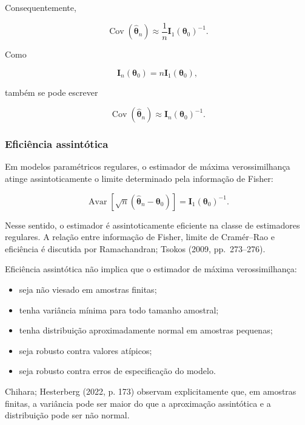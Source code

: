 \documentclass[
  letterpaper,
  DIV=11,
  numbers=noendperiod]{scrreprt}
\providecommand{\tightlist}{%
  \setlength{\itemsep}{0pt}\setlength{\parskip}{0pt}}\usepackage{longtable,booktabs,array}
\begin{document}
Consequentemente,

\[\operatorname{Cov}
\left(
\widehat{\boldsymbol\theta}_n
\right)
\approx
\frac{1}{n}
\mathbf{I}_1(\boldsymbol\theta_0)^{-1}.\]

Como

\[\mathbf{I}_n(\boldsymbol\theta_0)
=
n\mathbf{I}_1(\boldsymbol\theta_0),\]

também se pode escrever

\[\operatorname{Cov}
\left(
\widehat{\boldsymbol\theta}_n
\right)
\approx
\mathbf{I}_n(\boldsymbol\theta_0)^{-1}.\]

\subsubsection{Eficiência
assintótica}\label{eficiuxeancia-assintuxf3tica-1}

Em modelos paramétricos regulares, o estimador de máxima verossimilhança
atinge assintoticamente o limite determinado pela informação de Fisher:

\[\operatorname{Avar}
\left[
\sqrt n
\left(
\widehat{\boldsymbol\theta}_n
-
\boldsymbol\theta_0
\right)
\right]
=
\mathbf{I}_1(\boldsymbol\theta_0)^{-1}.\]

Nesse sentido, o estimador é assintoticamente eficiente na classe de
estimadores regulares. A relação entre informação de Fisher, limite de
Cramér--Rao e eficiência é discutida por Ramachandran; Tsokos (2009,
pp.~273--276).

\begin{tcolorbox}[enhanced jigsaw, colback=white, leftrule=.75mm, colbacktitle=quarto-callout-warning-color!10!white, breakable, titlerule=0mm, bottomtitle=1mm, title=\textcolor{quarto-callout-warning-color}{\faExclamationTriangle}\hspace{0.5em}{Interpretação}, colframe=quarto-callout-warning-color-frame, toprule=.15mm, opacityback=0, bottomrule=.15mm, opacitybacktitle=0.6, arc=.35mm, toptitle=1mm, rightrule=.15mm, coltitle=black, left=2mm]

Eficiência assintótica não implica que o estimador de máxima
verossimilhança:

\begin{itemize}
\tightlist
\item
  seja não viesado em amostras finitas;
\item
  tenha variância mínima para todo tamanho amostral;
\item
  tenha distribuição aproximadamente normal em amostras pequenas;
\item
  seja robusto contra valores atípicos;
\item
  seja robusto contra erros de especificação do modelo.
\end{itemize}

Chihara; Hesterberg (2022, p. 173) observam explicitamente que, em
amostras finitas, a variância pode ser maior do que a aproximação
assintótica e a distribuição pode ser não normal.

\end{tcolorbox}
\end{document}
